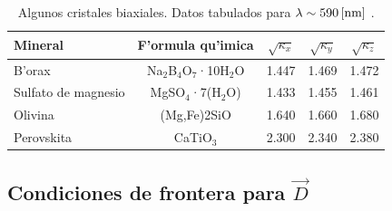 \begin{table}[!h]
\begin{center}
\begin{tabular}{l c |c|c|c}
Mineral			& F'ormula qu'imica		& $\sqrt{\kappa_x}$	&	$\sqrt{\kappa_y}$	&  $\sqrt{\kappa_z}$	\\
\hline\hline
B'orax 	 		&Na$_2$B$_4$O$_7$·10H$_2$O& 	1.447	& 	1.469	& 	1.472	\\
Sulfato de magnesio		&  MgSO$_4$·7(H$_2$O)	& 	1.433	& 	1.455	& 	1.461	\\
Olivina			& 	(Mg,Fe)2SiO	& 	1.640	& 	1.660	& 	1.680	\\
Perovskita		& 	CaTiO$_3$	& 	2.300	& 	2.340	& 	2.380	%
\end{tabular}
\caption{Algunos cristales biaxiales. Datos tabulados para $\lambda\sim 590\,{\rm [nm]}$ \cite{hyper}.}
\end{center}
\end{table}
\subsection{Condiciones de frontera para $\vec{D}$}

